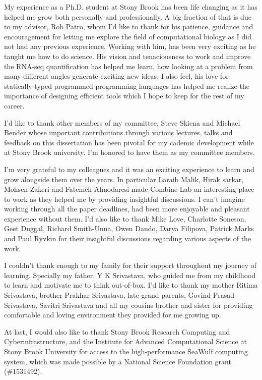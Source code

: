 \documentclass[
11pt, %
english, %
singlespacing, %
headsepline, %
]{main} %
\begin{document}
\begin{acknowledgements}
\addchaptertocentry{\acknowledgementname} %

My experience as a Ph.D. student at Stony Brook has been life changing as it has helped me 
grow both personally and professionally. A big fraction of that is due to my advisor, 
Rob Patro, whom I'd like to thank for his patience, guidance and encouragement for letting 
me explore the field of computational biology as I did not had any previous experience. 
Working with him, has been very exciting as he taught me how to do science. His vision 
and tenaciousness to work and improve the RNA-seq quantification has helped me learn, 
how looking at a problem from many different angles generate exciting new ideas. I also 
feel, his love for statically-typed programmed programming languages has helped me realize 
the importance of designing efficient tools which I hope to keep for the rest of my career.

I'd like to thank other members of my committee, Steve Skiena and Michael Bender whose 
important contributions through various lectures, talks and feedback on this dissertation has 
been pivotal for my cademic development while at Stony Brook university. I'm honored to 
have them as my committee members.

I'm very grateful to my colleagues and it was an exciting experience to learn and grow
alongside them over the years. In particular Laraib Malik, Hirak sarkar, Mohsen Zakeri
and Fatemeh Almodaresi made Combine-Lab an interesting place to work as they helped me by 
providing insightful discussions. I can't imagine working through all the paper deadlines,
had been more enjoyable and pleasant experience without them. I'd also like to thank Mike Love, 
Charlotte Soneson, Geet Duggal, Richard Smith-Unna, Owen Dando, Darya Filipova, Patrick Marks 
and Paul Ryvkin for their insightful discussions regarding various aspects of the work.

I couldn't thank enough to my family for their support throughout my journey of learning. 
Specially my father, Y K Srivastava, who guided me from my childhood to learn and motivate me 
to think out-of-box. I'd like to thank my mother Ritima Srivastava, brother Prakhar Srivastava,
late grand parents, Govind Prasad Srivastava, Savitri Srivastava and all my cousins brother and
sister for providing comfortable and loving environment they provided for me growing up. 

At last, I would also like to thank Stony Brook Research Computing and 
Cyberinfrastructure, and the Institute for Advanced Computational Science at Stony Brook 
University for access to the high-performance SeaWulf computing system, which was made 
possible by a National Science Foundation grant (\#1531492).
\end{acknowledgements}
\end{document}
